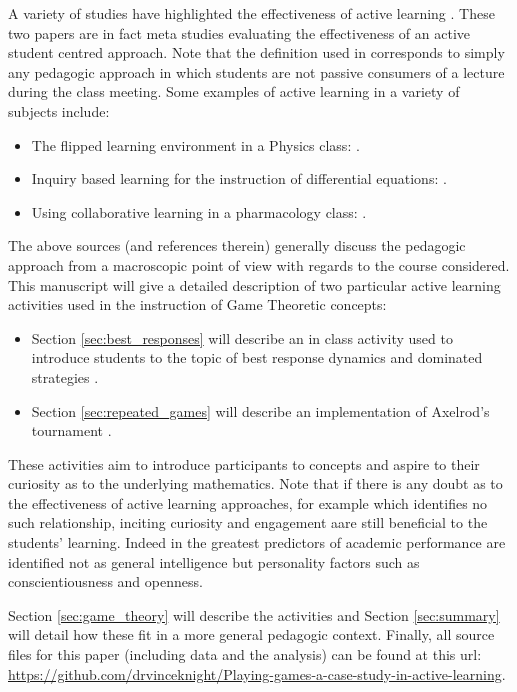 \documentclass[12pt, a4paper]{article}
\begin{document}
A variety of studies have highlighted the effectiveness of active learning
\cite{Freeman2014, Hake1998, Prince2004}. These two papers are in fact meta
studies evaluating the effectiveness of an active student centred approach. Note
that the definition used in \cite{Freeman2014} corresponds to simply any
pedagogic approach in which students are not passive consumers of a lecture
during the class meeting. Some examples of active learning in a variety of
subjects include:

\begin{itemize}
    \item The flipped learning environment in a Physics class: \cite{Bates}.
    \item Inquiry based learning for the instruction of differential equations:
        \cite{Kwon2005}.
    \item Using collaborative learning in a pharmacology class:
        \cite{Depaz2008}.
\end{itemize}

The above sources (and references therein) generally discuss the pedagogic
approach from a macroscopic point of view with regards to the course considered.
This manuscript will give a detailed description of two particular active
learning activities used in the instruction of Game Theoretic concepts:

\begin{itemize}
    \item Section \ref{sec:best_responses} will describe an in class activity
        used to introduce students to the topic of best response dynamics and
        dominated strategies \cite{Maschler2013}.
    \item Section \ref{sec:repeated_games} will describe an implementation of
        Axelrod's tournament \cite{Axelrod1980a, Axelrod1980b}.
\end{itemize}

These activities aim to introduce participants to concepts and aspire to their
curiosity as to the underlying mathematics. Note that if there is any doubt as
to the effectiveness of active learning approaches, for example
\cite{Andrews2011} which identifies no such relationship, inciting curiosity and
engagement aare still beneficial to the students' learning.  Indeed in
\cite{Poropat2014}  the greatest predictors of academic performance are
identified not as general intelligence \cite{Wright1905} but personality factors
such as conscientiousness and openness.

Section \ref{sec:game_theory} will describe the activities and Section
\ref{sec:summary} will detail how these fit in a more general pedagogic context.
Finally, all source files for this paper (including data and the analysis) can
be found at this url:
\url{https://github.com/drvinceknight/Playing-games-a-case-study-in-active-learning}.
\end{document}
